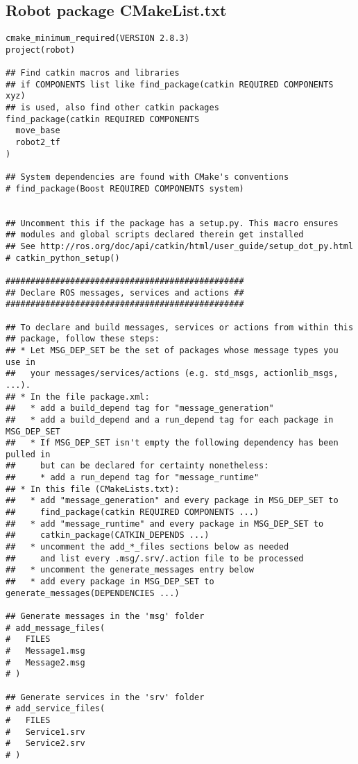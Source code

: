 \subsection{Robot package CMakeList.txt}
\begin{lstlisting}
cmake_minimum_required(VERSION 2.8.3)
project(robot)

## Find catkin macros and libraries
## if COMPONENTS list like find_package(catkin REQUIRED COMPONENTS xyz)
## is used, also find other catkin packages
find_package(catkin REQUIRED COMPONENTS
  move_base
  robot2_tf
)

## System dependencies are found with CMake's conventions
# find_package(Boost REQUIRED COMPONENTS system)


## Uncomment this if the package has a setup.py. This macro ensures
## modules and global scripts declared therein get installed
## See http://ros.org/doc/api/catkin/html/user_guide/setup_dot_py.html
# catkin_python_setup()

################################################
## Declare ROS messages, services and actions ##
################################################

## To declare and build messages, services or actions from within this
## package, follow these steps:
## * Let MSG_DEP_SET be the set of packages whose message types you use in
##   your messages/services/actions (e.g. std_msgs, actionlib_msgs, ...).
## * In the file package.xml:
##   * add a build_depend tag for "message_generation"
##   * add a build_depend and a run_depend tag for each package in MSG_DEP_SET
##   * If MSG_DEP_SET isn't empty the following dependency has been pulled in
##     but can be declared for certainty nonetheless:
##     * add a run_depend tag for "message_runtime"
## * In this file (CMakeLists.txt):
##   * add "message_generation" and every package in MSG_DEP_SET to
##     find_package(catkin REQUIRED COMPONENTS ...)
##   * add "message_runtime" and every package in MSG_DEP_SET to
##     catkin_package(CATKIN_DEPENDS ...)
##   * uncomment the add_*_files sections below as needed
##     and list every .msg/.srv/.action file to be processed
##   * uncomment the generate_messages entry below
##   * add every package in MSG_DEP_SET to generate_messages(DEPENDENCIES ...)

## Generate messages in the 'msg' folder
# add_message_files(
#   FILES
#   Message1.msg
#   Message2.msg
# )

## Generate services in the 'srv' folder
# add_service_files(
#   FILES
#   Service1.srv
#   Service2.srv
# )


\end{lstlisting}
